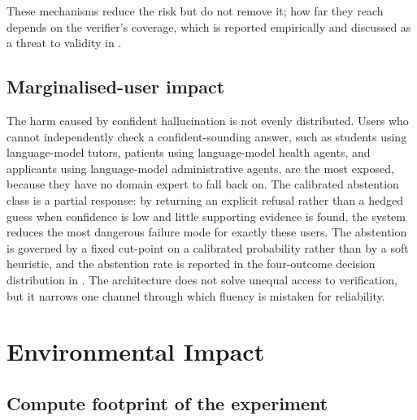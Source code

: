 These mechanisms reduce the risk but do not remove it; how far they reach depends on the verifier's coverage, which is reported empirically and discussed as a threat to validity in .

\subsection{Marginalised-user impact}
\label{sec:soc-marginalised}

The harm caused by confident hallucination is not evenly distributed. Users who cannot independently check a confident-sounding answer, such as students using language-model tutors, patients using language-model health agents, and applicants using language-model administrative agents, are the most exposed, because they have no domain expert to fall back on. The calibrated abstention class is a partial response: by returning an explicit refusal rather than a hedged guess when confidence is low and little supporting evidence is found, the system reduces the most dangerous failure mode for exactly these users. The abstention is governed by a fixed cut-point on a calibrated probability rather than by a soft heuristic, and the abstention rate is reported in the four-outcome decision distribution in . The architecture does not solve unequal access to verification, but it narrows one channel through which fluency is mistaken for reliability.

\section{Environmental Impact}
\label{sec:environment}

\subsection{Compute footprint of the experiment}
\label{sec:env-experiment}

